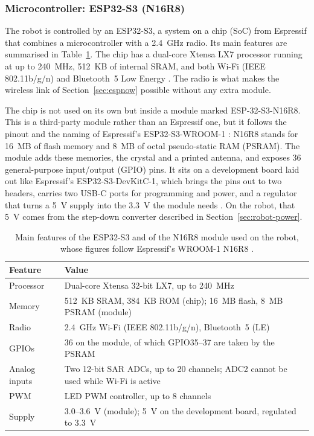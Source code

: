 \subsubsection{Microcontroller: ESP32-S3 (N16R8)}
The robot is controlled by an ESP32-S3, a system on a chip (SoC) from Espressif that
combines a microcontroller with a 2.4~GHz radio. Its main features are summarised in
Table~\ref{tab:esp32s3}. The chip has a dual-core Xtensa LX7 processor running at up to
240~MHz, 512~KB of internal SRAM, and both Wi-Fi (IEEE 802.11b/g/n) and Bluetooth~5
Low Energy \cite{esp32s3_datasheet}. The radio is what makes the wireless link of
Section~\ref{sec:espnow} possible without any extra module.

The chip is not used on its own but inside a module marked ESP-32-S3-N16R8. This is a
third-party module rather than an Espressif one, but it follows the pinout and the
naming of Espressif's ESP32-S3-WROOM-1 \cite{esp32s3_wroom1_datasheet}: N16R8 stands for
16~MB of flash memory and 8~MB of octal pseudo-static RAM (PSRAM). The module adds these
memories, the crystal and a printed antenna, and exposes 36 general-purpose input/output
(GPIO) pins. It sits on a development board laid out like Espressif's ESP32-S3-DevKitC-1,
which brings the pins out to two headers, carries two USB-C ports for programming and
power, and a regulator that turns a 5~V supply into the 3.3~V the module needs
\cite{esp32s3_devkitc1_guide}. On the robot, that 5~V comes from the
step-down converter described in Section~\ref{sec:robot-power}.

\begin{table}[htbp]
  \centering
  \caption[Main features of the ESP32-S3 N16R8 module]{Main features of the ESP32-S3 and of the N16R8 module used on the robot,
           whose figures follow Espressif's WROOM-1 N16R8
           \cite{esp32s3_datasheet,esp32s3_wroom1_datasheet}.}
  \label{tab:esp32s3}
  \begin{tabularx}{\textwidth}{@{}l X@{}}
    \toprule
    Feature & Value \\
    \midrule
    Processor & Dual-core Xtensa 32-bit LX7, up to 240~MHz \\
    Memory & 512~KB SRAM, 384~KB ROM (chip); 16~MB flash, 8~MB PSRAM (module) \\
    Radio & 2.4~GHz Wi-Fi (IEEE 802.11b/g/n), Bluetooth~5 (LE) \\
    GPIOs & 36 on the module, of which GPIO35--37 are taken by the PSRAM \\
    Analog inputs & Two 12-bit SAR ADCs, up to 20 channels; ADC2 cannot be used
                    while Wi-Fi is active \\
    PWM & LED PWM controller, up to 8 channels \\
    Supply & 3.0--3.6~V (module); 5~V on the development board, regulated to 3.3~V \\
    \bottomrule
  \end{tabularx}
\end{table}

